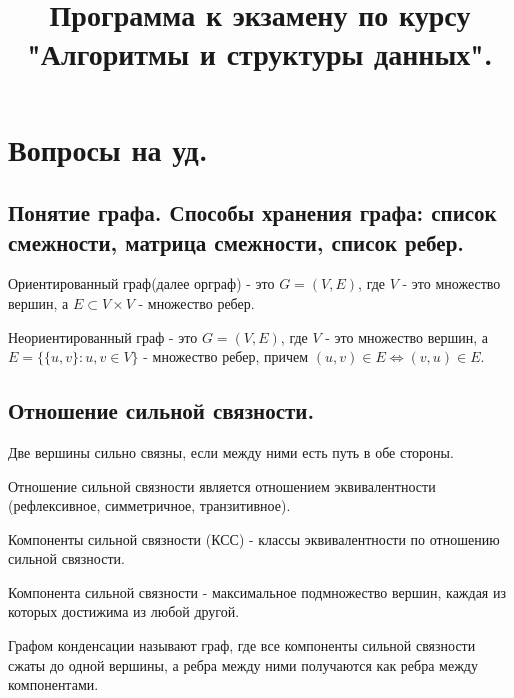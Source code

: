 \documentclass[a4paper,14pt]{article}
\title{Программа к экзамену по курсу "Алгоритмы и структуры данных".}
\date{}
\begin{document}
    \maketitle
    \newpage
    \tableofcontents
    \newpage
    \section{Вопросы на уд.}
    
    \subsection{Понятие графа. Способы хранения графа: список смежности, матрица смежности, список ребер.}

    \begin{Def}
        Ориентированный граф(далее орграф) - это $G = (V,E)$, где $V$ - это множество вершин, а $E\subset V\times V$ - множество ребер.
    \end{Def}
    \begin{Def}
        Неориентированный граф - это $G = (V,E)$, где $V$ - это множество вершин, а $E=\{\{u,v\}: u,v \in V\}$ - множество ребер, причем $(u,v)\in E \Leftrightarrow (v,u)\in E$.
    \end{Def}

    \subsection{Отношение сильной связности.}
    \label{subsec:strongly_connected_components}
    \begin{Def}
    Две вершины сильно связны, если между ними есть путь в обе стороны.
    \end{Def}
    Отношение сильной связности является отношением эквивалентности (рефлексивное, симметричное, транзитивное).
    \begin{Def}
        Компоненты сильной связности (КСС) - классы эквивалентности по отношению сильной связности.
    \end{Def}
    \begin{Def}
        Компонента сильной связности - максимальное подмножество вершин, каждая из которых достижима из любой другой.
    \end{Def}
    \begin{Def}
        Графом конденсации называют граф, где все компоненты сильной
        связности сжаты до одной вершины, а ребра между ними
        получаются как ребра между компонентами.
    \end{Def}
\end{document}
